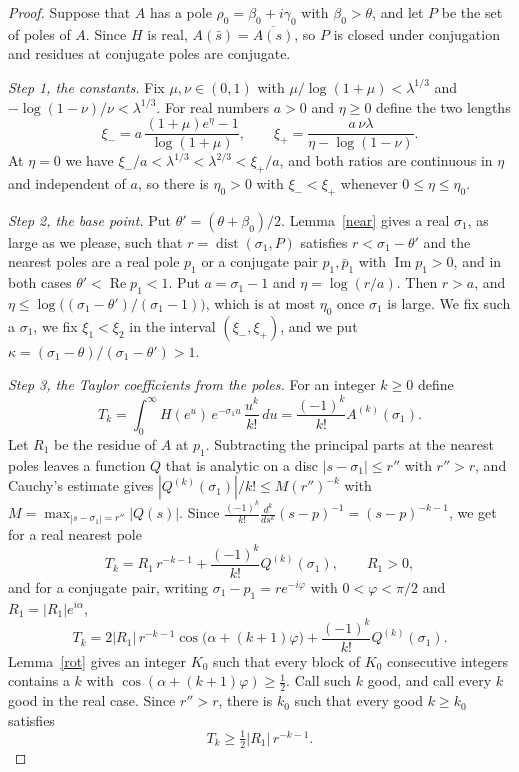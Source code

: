 \documentclass[11pt,letterpaper]{article}
\numberwithin{equation}{section}
\begin{document}
\begin{proof}
Suppose that $A$ has a pole $\rho_0=\beta_0+i\gamma_0$ with $\beta_0>\theta$, and let $P$ be the set of poles of $A$. Since $H$ is real, $A(\bar s)=\overline{A(s)}$, so $P$ is closed under conjugation and residues at conjugate poles are conjugate.

\emph{Step 1, the constants.} Fix $\mu,\nu\in(0,1)$ with $\mu/\log(1+\mu)<\lambda^{1/3}$ and $-\log(1-\nu)/\nu<\lambda^{1/3}$. For real numbers $a>0$ and $\eta\ge0$ define the two lengths
\[
\xi_-=a\,\frac{(1+\mu)e^{\eta}-1}{\log(1+\mu)},\qquad \xi_+=\frac{a\,\nu\lambda}{\eta-\log(1-\nu)} .
\]
At $\eta=0$ we have $\xi_-/a<\lambda^{1/3}<\lambda^{2/3}<\xi_+/a$, and both ratios are continuous in $\eta$ and independent of $a$, so there is $\eta_0>0$ with $\xi_-<\xi_+$ whenever $0\le\eta\le\eta_0$.

\emph{Step 2, the base point.} Put $\theta'=(\theta+\beta_0)/2$. Lemma~\ref{near} gives a real $\sigma_1$, as large as we please, such that $r=\operatorname{dist}(\sigma_1,P)$ satisfies $r<\sigma_1-\theta'$ and the nearest poles are a real pole $p_1$ or a conjugate pair $p_1,\bar p_1$ with $\operatorname{Im}p_1>0$, and in both cases $\theta'<\operatorname{Re}p_1<1$. Put $a=\sigma_1-1$ and $\eta=\log(r/a)$. Then $r>a$, and $\eta\le\log\big((\sigma_1-\theta')/(\sigma_1-1)\big)$, which is at most $\eta_0$ once $\sigma_1$ is large. We fix such a $\sigma_1$, we fix $\xi_1<\xi_2$ in the interval $(\xi_-,\xi_+)$, and we put $\kappa=(\sigma_1-\theta)/(\sigma_1-\theta')>1$.

\emph{Step 3, the Taylor coefficients from the poles.} For an integer $k\ge0$ define
\[
T_k=\int_0^\infty H(e^u)\,e^{-\sigma_1u}\,\frac{u^k}{k!}\,du=\frac{(-1)^k}{k!}A^{(k)}(\sigma_1).
\]
Let $R_1$ be the residue of $A$ at $p_1$. Subtracting the principal parts at the nearest poles leaves a function $Q$ that is analytic on a disc $|s-\sigma_1|\le r''$ with $r''>r$, and Cauchy's estimate gives $|Q^{(k)}(\sigma_1)|/k!\le M(r'')^{-k}$ with $M=\max_{|s-\sigma_1|=r''}|Q(s)|$. Since $\frac{(-1)^k}{k!}\frac{d^k}{ds^k}(s-p)^{-1}=(s-p)^{-k-1}$, we get for a real nearest pole
\[
T_k=R_1\,r^{-k-1}+\frac{(-1)^k}{k!}Q^{(k)}(\sigma_1),\qquad R_1>0 ,
\]
and for a conjugate pair, writing $\sigma_1-p_1=re^{-i\varphi}$ with $0<\varphi<\pi/2$ and $R_1=|R_1|e^{i\alpha}$,
\[
T_k=2|R_1|\,r^{-k-1}\cos\!\big(\alpha+(k+1)\varphi\big)+\frac{(-1)^k}{k!}Q^{(k)}(\sigma_1).
\]
Lemma~\ref{rot} gives an integer $K_0$ such that every block of $K_0$ consecutive integers contains a $k$ with $\cos(\alpha+(k+1)\varphi)\ge\tfrac12$. Call such $k$ good, and call every $k$ good in the real case. Since $r''>r$, there is $k_0$ such that every good $k\ge k_0$ satisfies
\begin{equation}\label{lower}
T_k\ge\tfrac12|R_1|\,r^{-k-1}.
\end{equation}


\end{proof}
\end{document}
